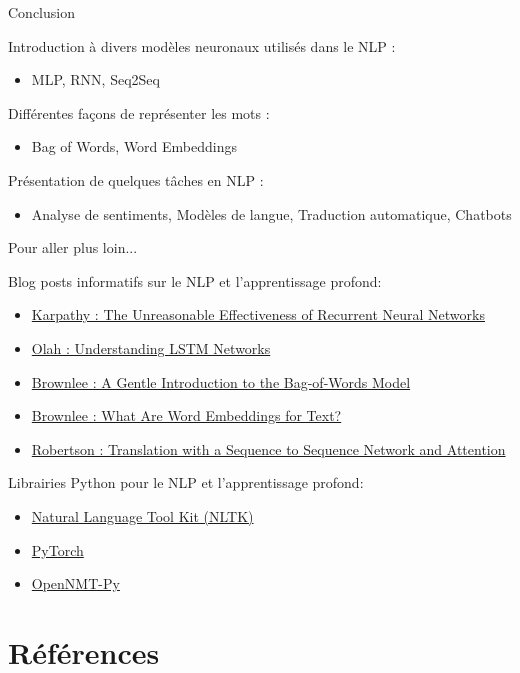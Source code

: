 \documentclass[french]{beamer}
\begin{document}
\begin{frame}{Conclusion}

\vspace{.3cm}
Introduction à divers modèles neuronaux utilisés dans le NLP :
\begin{itemize}
	\item MLP, RNN, Seq2Seq
\end{itemize}
\vspace{.3cm}
Différentes façons de représenter les mots :
\begin{itemize}
	\item Bag of Words, Word Embeddings
\end{itemize}
\vspace{.3cm}
Présentation de quelques tâches en NLP :
\begin{itemize}
	\item Analyse de sentiments, Modèles de langue, Traduction automatique, Chatbots
\end{itemize}
\end{frame}

\begin{frame}{Pour aller plus loin...}

Blog posts informatifs sur le NLP et l'apprentissage profond:
\begin{itemize}
	\item \href{http://karpathy.github.io/2015/05/21/rnn-effectiveness/}{Karpathy : The Unreasonable Effectiveness of Recurrent Neural Networks}
	\item \href{http://colah.github.io/posts/2015-08-Understanding-LSTMs/}{Olah : Understanding LSTM Networks}
	\item \href{https://machinelearningmastery.com/gentle-introduction-bag-words-model/}{Brownlee : A Gentle Introduction to the Bag-of-Words Model}
	\item \href{https://machinelearningmastery.com/what-are-word-embeddings/}{Brownlee : What Are Word Embeddings for Text?}
	\item \href{https://pytorch.org/tutorials/intermediate/seq2seq_translation_tutorial.html}{Robertson : Translation with a Sequence to Sequence Network and Attention}
\end{itemize}

\vspace{.3cm}
Librairies Python pour le NLP et l'apprentissage profond:
\begin{itemize}
	\item \href{https://www.nltk.org/}{Natural Language Tool Kit (NLTK)}
	\item \href{https://pytorch.org/}{PyTorch}
	\item \href{http://opennmt.net/OpenNMT-py/}{OpenNMT-Py}
\end{itemize}

\end{frame}

\section*{Références}

\end{document}
